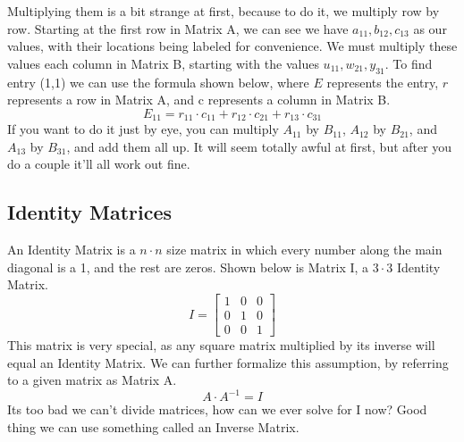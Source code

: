 \documentclass[final,1p,12pt]{elsarticle}
\begin{document}
        Multiplying them is a bit strange at first, because to do it, we multiply row by row.
        Starting at the first row in Matrix A, we can see we have $a_{11},b_{12},c_{13}$ as our values, with their locations being labeled for convenience.
        We must multiply these values each column in Matrix B, starting with the values $u_{11},w_{21},y_{31}$.
        To find entry (1,1) we can use the formula shown below, where $E$ represents the entry, $r$ represents a row in Matrix A, and c represents a column in Matrix B.
        \begin{equation*}
            E_{11} = r_{11} \cdot c_{11}  +  r_{12} \cdot c_{21}  +   r_{13} \cdot c_{31}
        \end{equation*}
        If you want to do it just by eye, you can multiply $A_{11}$ by $B_{11}$, $A_{12}$ by $B_{21}$, and $A_{13}$ by $B_{31}$, and add them all up.
        It will seem totally awful at first, but after you do a couple it'll all work out fine.
        
    \subsection{Identity Matrices}
        An Identity Matrix is a $n\cdot n$ size matrix in which every number along the main diagonal is a 1, and the rest are zeros.
        Shown below is Matrix I, a $3\cdot 3$ Identity Matrix.
        \begin{equation*}
        I =
            \begin{bmatrix}
                1 & 0 & 0\\
                0 & 1 & 0\\
                0 & 0 & 1
            \end{bmatrix}
        \end{equation*}
        This matrix is very special, as any square matrix multiplied by its inverse will equal an Identity Matrix.
        We can further formalize this assumption, by referring to a given matrix as Matrix A.
        \begin{equation*}
            A\cdot A^{-1} = I
        \end{equation*}
        Its too bad we can't divide matrices, how can we ever solve for I now? Good thing we can use something called an Inverse Matrix.
        
\end{document}
